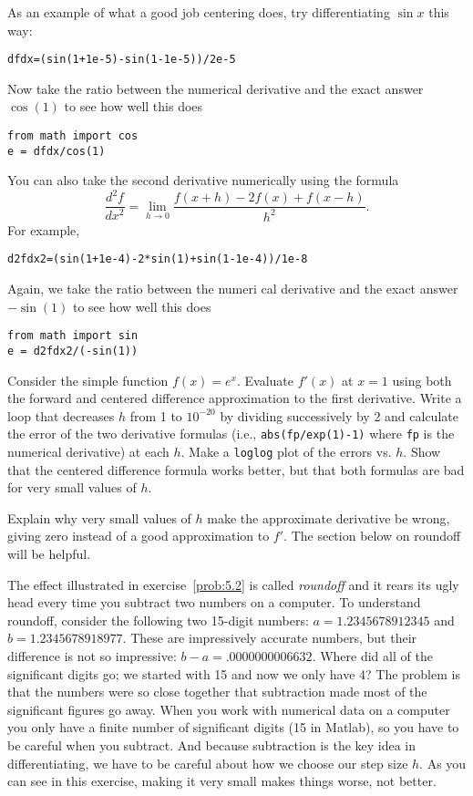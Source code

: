 As an example of what a good job centering does, try differentiating
$\sin{x}$ this way:
\begin{Verbatim}
dfdx=(sin(1+1e-5)-sin(1-1e-5))/2e-5
\end{Verbatim}
Now take the ratio between the numerical derivative and the exact answer
$\cos(1)$ to see how well this does
\begin{Verbatim}
from math import cos
e = dfdx/cos(1)
\end{Verbatim}
You can also take the second derivative numerically using the formula
\begin{equation}
\frac{d^2 f }{ dx^2} = \lim_{ h \rightarrow 0}
\frac{f(x+h)-2 f(x)+f(x-h) }{ h^2} .
\end{equation}
For example,
\begin{Verbatim}
d2fdx2=(sin(1+1e-4)-2*sin(1)+sin(1-1e-4))/1e-8
\end{Verbatim}
Again, we take the ratio between the numeri
cal derivative and the exact
answer $-\sin(1)$ to see how well this does
\begin{Verbatim}
from math import sin
e = d2fdx2/(-sin(1))
\end{Verbatim}


\begin{enumerate}
\prob \label{prob:5.2} Consider the simple function $f(x)=e^x$. Evaluate $f'(x)$ at $x=1$
    using both the forward and centered difference approximation to the
    first derivative. Write a loop that decreases $h$ from 1 to
    $10^{-20}$ by dividing successively by 2 and calculate the error of
    the two derivative formulas (i.e., \texttt{abs(fp/exp(1)-1)} where
    \texttt{fp} is the numerical derivative) at each $h$.  Make a
    \texttt{loglog} plot of the errors vs. $h$. Show that the centered
    difference formula works better, but that both formulas are bad for
    very small values of $h$.

    Explain why very small values of $h$ make the approximate derivative
    be wrong, giving zero instead of a good approximation to $f'$. The
    section below on roundoff will be helpful.
\end{enumerate}

The effect illustrated in exercise~\ref{prob:5.2} is called {\it roundoff}
and it rears its ugly head every time you subtract two numbers on a computer.
To understand roundoff, consider the following two 15-digit numbers:
$a=1.2345678912345$ and $b=1.2345678918977$. These are impressively accurate
numbers, but their difference is not so impressive: $b-a=.0000000006632$.
Where did all of the significant digits go; we started with 15 and now we
only have 4? The problem is that the numbers were so close together that
subtraction made most of the significant figures go away. When you work with
numerical data on a computer you only have a finite number of significant
digits (15 in Matlab), so you have to be careful when you subtract. And
because subtraction is the key idea in differentiating, we have to be careful
about how we choose our step size $h$. As you can see in this exercise,
making it very small makes things worse, not better.


\labsection{}